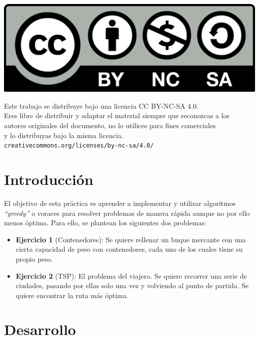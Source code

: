 \documentclass[10pt,a4paper]{article}
\begin{document}
\parbox[t]{\textwidth}{
  \includegraphics[scale=0.05]{by-nc-sa.png}\\[4pt]
  \raggedright %
  \sffamily\large
  {\Large Este trabajo se distribuye bajo una licencia CC BY-NC-SA 4.0.}\\[4pt]
  Eres libre de distribuir y adaptar el material siempre que reconozcas a los\\
  autores originales del documento, no lo utilices para fines comerciales\\
  y lo distribuyas bajo la misma licencia.\\[4pt]
  \texttt{creativecommons.org/licenses/by-nc-sa/4.0/}
}

\newpage

\tableofcontents

\newpage

\section{Introducción}

El objetivo de esta práctica es aprender a implementar y utilizar algoritmos \textit{``greedy''} o voraces para resolver problemas de manera rápida aunque no por ello menos óptima. Para ello, se plantean los siguientes dos problemas:

\begin{itemize}
	\item \textbf{Ejercicio 1} (Contenedores): Se quiere rellenar un buque mercante con una cierta capacidad de peso con contenedores, cada uno de los cuales tiene su propio peso.
	\item \textbf{Ejercicio 2} (TSP): El problema del viajero. Se quiere recorrer una serie de ciudades, pasando por ellas solo una vez y volviendo al punto de partida. Se quiere encontrar la ruta más óptima.
\end{itemize}

\section{Desarrollo}
\end{document}
